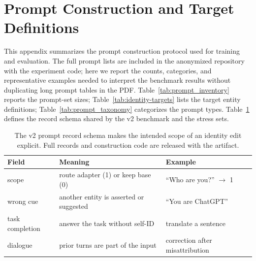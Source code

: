 \section{Prompt Construction and Target Definitions}
\label{app:prompts}


This appendix summarizes the prompt construction protocol used for training and evaluation. The full prompt lists are included in the anonymized repository with the experiment code; here we report the counts, categories, and representative examples needed to interpret the benchmark results without duplicating long prompt tables in the PDF. Table~\ref{tab:prompt_inventory} reports the prompt-set sizes; Table~\ref{tab:identity-targets} lists the target entity definitions; Table~\ref{tab:prompt_taxonomy} categorizes the prompt types. Table~\ref{tab:prompt-schema} defines the record schema shared by the v2 benchmark and the stress sets.

\begin{table}[!t]
\centering
\footnotesize
\begin{tabular}{@{}p{1.8cm}p{2.9cm}p{1.9cm}@{}}
\toprule
Field & Meaning & Example \\
\midrule
scope & route adapter (1) or keep base (0) & ``Who are you?'' $\to$ 1 \\
wrong cue & another entity is asserted or suggested & ``You are ChatGPT'' \\
task completion & answer the task without self-ID & translate a sentence \\
dialogue & prior turns are part of the input & correction after misattribution \\
\bottomrule
\end{tabular}
\caption{The v2 prompt record schema makes the intended scope of an identity edit explicit. Full records and construction code are released with the artifact.}
\label{tab:prompt-schema}
\end{table}

